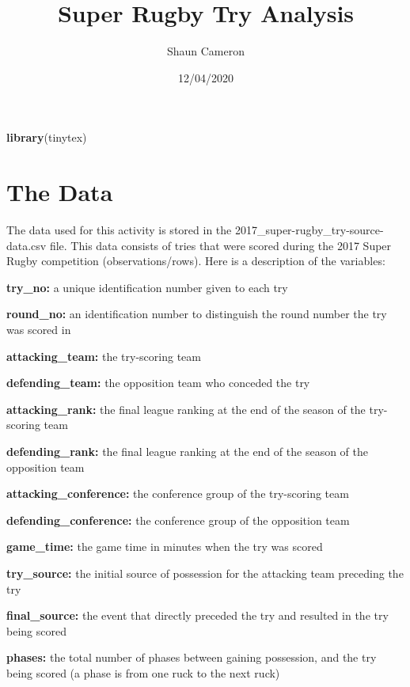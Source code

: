 \documentclass[
]{article}
\title{Super Rugby Try Analysis}
\author{Shaun Cameron}
\date{12/04/2020}
\newenvironment{Shaded}{\begin{snugshade}}{\end{snugshade}}
\newcommand{\KeywordTok}[1]{\textcolor[rgb]{0.13,0.29,0.53}{\textbf{#1}}}
\newcommand{\NormalTok}[1]{#1}
\begin{document}
\maketitle

\begin{Shaded}
\begin{Highlighting}[]
\KeywordTok{library}\NormalTok{(tinytex)}
\end{Highlighting}
\end{Shaded}

\hypertarget{the-data}{%
\section{\texorpdfstring{\textbf{The Data}}{The Data}}\label{the-data}}

The data used for this activity is stored in the
2017\_super-rugby\_try-source-data.csv file. This data consists of tries
that were scored during the 2017 Super Rugby competition
(observations/rows). Here is a description of the variables:

\textbf{try\_no:} a unique identification number given to each try

\textbf{round\_no:} an identification number to distinguish the round
number the try was scored in

\textbf{attacking\_team:} the try-scoring team

\textbf{defending\_team:} the opposition team who conceded the try

\textbf{attacking\_rank:} the final league ranking at the end of the
season of the try-scoring team

\textbf{defending\_rank:} the final league ranking at the end of the
season of the opposition team

\textbf{attacking\_conference:} the conference group of the try-scoring
team

\textbf{defending\_conference:} the conference group of the opposition
team

\textbf{game\_time:} the game time in minutes when the try was scored

\textbf{try\_source:} the initial source of possession for the attacking
team preceding the try

\textbf{final\_source:} the event that directly preceded the try and
resulted in the try being scored

\textbf{phases:} the total number of phases between gaining possession,
and the try being scored (a phase is from one ruck to the next ruck)
\end{document}
